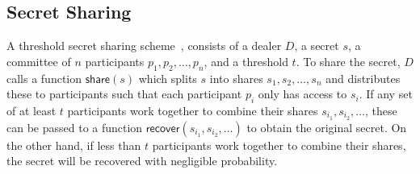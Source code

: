 \subsection{Secret Sharing}
A threshold secret sharing scheme~\cite{shamir_ss}, consists of a dealer $D$, a secret $s$, a committee of $n$ participants $p_1, p_2, \dots, p_n$, and a threshold $t$.
To share the secret, $D$ calls a function $\textsf{share}(s)$ which splits $s$ into shares $s_1, s_2, \dots, s_n$ and distributes these to participants such that each participant $p_i$ only has access to $s_i$.
If any set of at least $t$ participants work together to combine their shares $s_{i_1}, s_{i_2}, \dots$, these can be passed to a function $\textsf{recover}(s_{i_1}, s_{i_2}, \dots)$ to obtain the original secret.
On the other hand, if less than $t$ participants work together to combine their shares, the secret will be recovered with negligible probability.